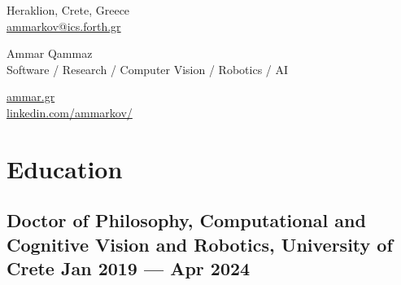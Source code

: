 \documentclass[a4,8pt]{article}
\begin{document}
 
\begin{center}
    \begin{minipage}[b]{0.24\textwidth}
            \large Heraklion, Crete, Greece \\
            \large \href{mailto:ammarkov@ics.forth.gr}{ammarkov@ics.forth.gr} 
    \end{minipage}%
    \begin{minipage}[b]{0.5\textwidth}
            \centering
            {\HUGE Ammar Qammaz} \\ %
            \vspace{0.1cm}
            {\color{UICOLOR} {Software / Research / Computer Vision / Robotics / AI }} \\
    \end{minipage}%
    \begin{minipage}[b]{0.24\textwidth}
            \flushright \large  %
            {\href{http://ammar.gr}{ammar.gr} } \\ 
            {\href{https://www.linkedin.com/in/ammarkov}{linkedin.com/ammarkov/} }
    \end{minipage}   
    
\vspace{-0.15cm} 
{\color{UICOLOR} \hrulefill}
\end{center}


\linespread{0.82} 
\section{Education}
\linespread{0.6}
\subsection*{Doctor of Philosophy, Computational and Cognitive Vision and Robotics, {\normalsize \normalfont University of Crete } \hfill Jan 2019 --- Apr 2024} 
\vspace{0.1cm}
\end{document}
